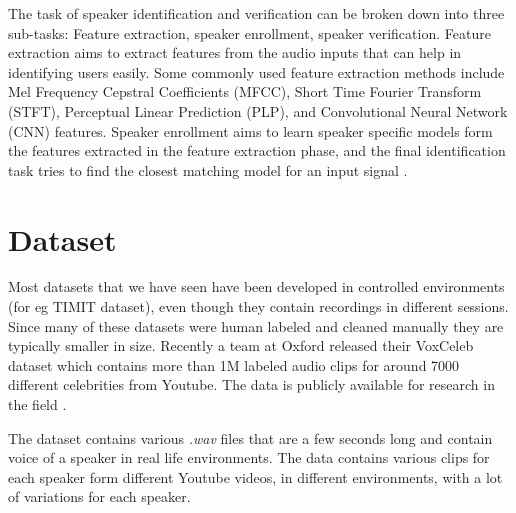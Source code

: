\documentclass[letterpaper]{article}
\begin{document}
The task of speaker identification and verification can be broken down into three sub-tasks: Feature extraction, speaker enrollment, speaker verification.
Feature extraction aims to extract features from the audio inputs that can help in identifying users easily. Some commonly used feature extraction  methods include Mel Frequency Cepstral Coefficients (MFCC), Short Time Fourier Transform (STFT), Perceptual Linear Prediction (PLP), and Convolutional Neural Network (CNN) features.
Speaker enrollment aims to learn speaker specific models form the features extracted in the feature extraction phase, and the final identification task tries to find the closest matching model for an input signal \cite{sv-cnn}. 

\section{Dataset}
Most datasets that we have seen have been developed in controlled environments (for eg TIMIT dataset), even though they contain recordings in different sessions. Since many of these datasets were human labeled and cleaned manually they are typically smaller in size. Recently a team at Oxford released their VoxCeleb dataset which contains more than 1M labeled audio clips for around 7000 different celebrities from Youtube. The data is publicly available for research in the field \cite{voxCeleb}.

The dataset contains various \emph{.wav} files that are a few seconds long and contain voice of a speaker in real life environments. The data contains various clips for each speaker form different Youtube videos, in different environments, with a lot of variations for each speaker.
\end{document}
